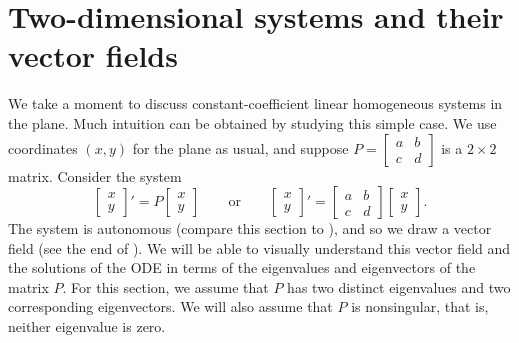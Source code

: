 
\sectionnewpage
\section{Two-dimensional systems and their vector fields}
\label{sec:twodimaut}


We take a moment to discuss constant-coefficient linear
homogeneous systems in the plane.
Much intuition can be obtained by studying this simple case.
We use coordinates $(x,y)$ for the plane as usual,
and suppose
$P = \left[ \begin{smallmatrix} a & b \\ c & d \end{smallmatrix} \right]$ 
is a $2 \times 2$ matrix.  Consider the system
\begin{equation} \label{pln:eq}
\begin{bmatrix} x \\ y \end{bmatrix} ' =
P \begin{bmatrix} x \\ y \end{bmatrix} 
\qquad 
\text{or}
\qquad
\begin{bmatrix} x \\ y \end{bmatrix} ' =
\begin{bmatrix} a & b \\ c & d \end{bmatrix} 
\begin{bmatrix} x \\ y \end{bmatrix} 
.
\end{equation}
The system is autonomous (compare this section
to ),
and so we draw a vector field (see the end of
).
We will be able to visually understand this vector field
and the solutions of the ODE in terms of the
eigenvalues and eigenvectors of the matrix $P$.
For this section,
we assume that $P$ has two distinct eigenvalues and two corresponding
eigenvectors.
We will also assume that $P$ is nonsingular, that is,
neither eigenvalue is zero.

\medskip

